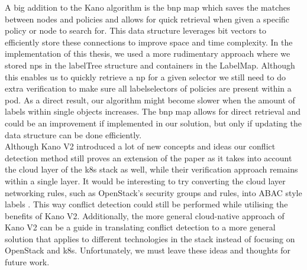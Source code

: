 A big addition to the Kano algorithm is the \acrfull{bnp} map which saves the matches between nodes and policies and allows for quick retrieval when given a specific policy or node to search for. This data structure leverages bit vectors to efficiently store these connections to improve space and time complexity. In the implementation of this thesis, we used a more rudimentary approach where we stored \acrshort{np}s in the labelTree structure and containers in the LabelMap. Although this enables us to quickly retrieve a \acrshort{np} for a given selector we still need to do extra verification to make sure all labelselectors of policies are present within a pod. As a direct result, our algorithm might become slower when the amount of labels within single objects increases. The \acrshort{bnp} map allows for direct retrieval and could be an improvement if implemented in our solution, but only if updating the data structure can be done efficiently.
\\[10pt]

Although Kano V2 introduced a lot of new concepts and ideas our conflict detection method still proves an extension of the paper as it takes into account the cloud layer of the \acrshort{k8s} stack as well, while their verification approach remains within a single layer. It would be interesting to try converting the cloud layer networking rules, such as OpenStack's security groups and rules, into ABAC style labels \cite{sg} \cite{sgrule}. This way conflict detection could still be performed while utilising the benefits of Kano V2. Additionally, the more general cloud-native approach of Kano V2 can be a guide in translating conflict detection to a more general solution that applies to different technologies in the stack instead of focusing on OpenStack and \acrshort{k8s}. Unfortunately, we must leave these ideas and thoughts for future work.

\cleardoublepage
